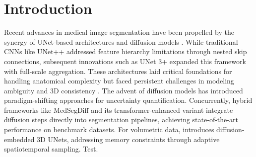 \section{Introduction}
\begin{multicols}{2}
\noindent
Recent advances in medical image segmentation have been propelled by the synergy of UNet-based architectures \cite{zhou2020unet++, huang2021unet3+} and diffusion models \cite{liu2024biomedical, shi2025diffusion}. While traditional CNNs like UNet++ \cite{zhou2020unet++} addressed feature hierarchy limitations through nested skip connections, subsequent innovations such as UNet 3+ \cite{huang2021unet3+} expanded this framework with full-scale aggregation. These architectures laid critical foundations for handling anatomical complexity but faced persistent challenges in modeling ambiguity \cite{rahman2023ambiguous} and 3D consistency \cite{hu2024diffunet}.
The advent of diffusion models has introduced paradigm-shifting approaches for uncertainty quantification. Concurrently, hybrid frameworks like MedSegDiff \cite{wu2023medsegdiff} and its transformer-enhanced variant \cite{wu2023medsegdiffv2} integrate diffusion steps directly into segmentation pipelines, achieving state-of-the-art performance on benchmark datasets. For volumetric data, \cite{hu2024diffunet} introduces diffusion-embedded 3D UNets, addressing memory constraints through adaptive spatiotemporal sampling. Test.
\end{multicols}

